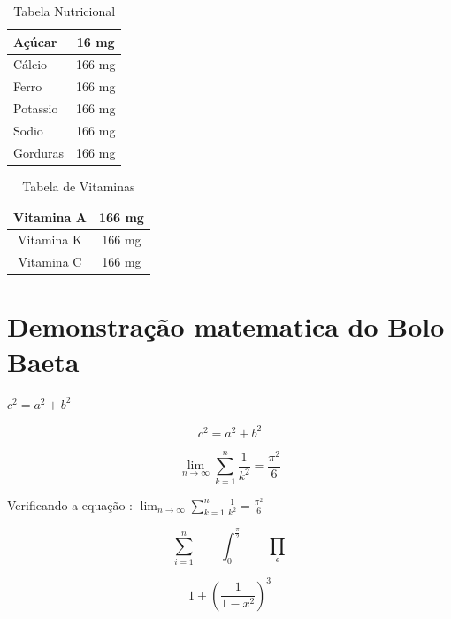\documentclass[a4paper,11pt,twocolumn]{article}
\begin{document}
\begin {table}[h!]
\begin{center}
\begin{tabular}{p{3.2cm}c}
\hline
Açúcar     & 16 mg  \\ \hline
Cálcio     & 166 mg  \\ \hline
Ferro      & 166 mg  \\ \hline
Potassio   & 166 mg  \\ \hline 
Sodio      & 166 mg  \\ \hline
Gorduras   & 166 mg  \\ \hline
\end{tabular}
\caption {Tabela Nutricional}
\label{tab_nutri} 
\end{center}
\end{table}

\begin {table}[h!]
\begin{center}
\begin{tabular}{|c|c|}
\hline
Vitamina A & 166 mg  \\ \hline
Vitamina K & 166 mg  \\ \hline
Vitamina C & 166 mg  \\ \hline
\end{tabular}
\caption {Tabela de Vitaminas}
\label{tab_vitaminas} 
\end{center}
\end{table}

\section{Demonstração matematica do Bolo Baeta}

$c^{2}=a^{2}+b^{2}$

\begin{displaymath}
  c^{2}=a^{2}+b^{2}
\end{displaymath}

\begin{displaymath}
\lim_{n \to \infty}
\sum_{k=1}^n \frac{1}{k^2}
= \frac{\pi^2}{6}
\end{displaymath}

Verificando a equação : $\lim_{n \to \infty}
\sum_{k=1}^n \frac{1}{k^2}
= \frac{\pi^2}{6}$

\begin{displaymath}
\sum_{i=1}^{n} \qquad
\int_{0}^{\frac{\pi}{2}} \qquad
\prod_\epsilon
\end{displaymath}

\begin{displaymath}
1 + \left( \frac{1}{ 1-x^{2} }
\right) ^3
\end{displaymath}
\end{document}
